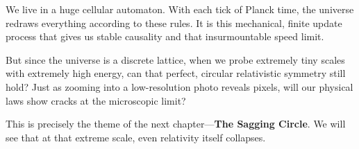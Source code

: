 We live in a huge cellular automaton. With each tick of Planck time, the universe redraws everything according to these rules. It is this mechanical, finite update process that gives us stable causality and that insurmountable speed limit.

But since the universe is a discrete lattice, when we probe extremely tiny scales with extremely high energy, can that perfect, circular relativistic symmetry still hold? Just as zooming into a low-resolution photo reveals pixels, will our physical laws show cracks at the microscopic limit?

This is precisely the theme of the next chapter---\textbf{The Sagging Circle}. We will see that at that extreme scale, even relativity itself collapses.


